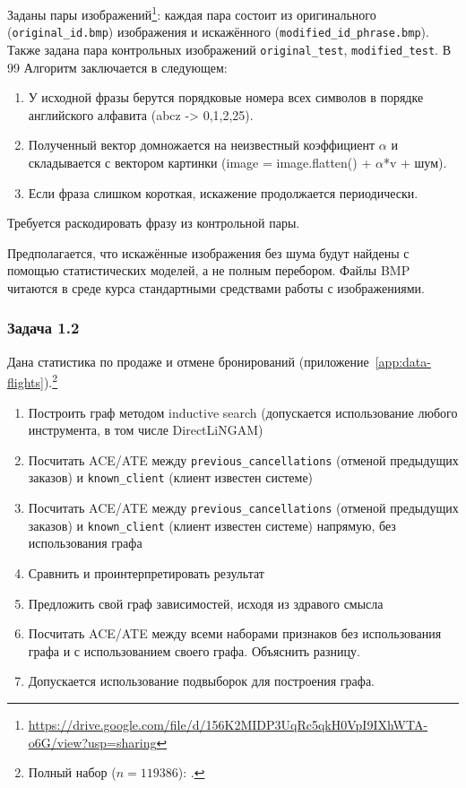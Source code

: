 Заданы пары изображений\footnote{\url{https://drive.google.com/file/d/156K2MIDP3UqRc5qkH0VpI9IXhWTA-o6G/view?usp=sharing}}: каждая пара состоит из оригинального (\texttt{original\_id.bmp}) изображения и искажённого (\texttt{modified\_id\_phrase.bmp}).
Также задана пара контрольных изображений \texttt{original\_test}, \texttt{modified\_test}.
В 99%
Алгоритм заключается в следующем:
\begin{enumerate}
    \item У исходной фразы берутся порядковые номера всех символов в порядке английского алфавита (abcz -> 0,1,2,25).
    \item Полученный вектор домножается на неизвестный коэффициент $\alpha$ и складывается с вектором картинки (image = image.flatten() + $\alpha$*v + шум).
    \item Если фраза слишком короткая, искажение продолжается периодически.
\end{enumerate}
Требуется раскодировать фразу из контрольной пары.
\begin{remark}
Предполагается, что искажённые изображения без шума будут найдены с помощью статистических моделей, а не полным перебором. Файлы BMP читаются в среде курса стандартными средствами работы с изображениями.
\end{remark}

\subsubsection{Задача 1.2}

Дана статистика по продаже и отмене бронирований (приложение~\ref{app:data-flights}).\footnote{Полный набор ($n=119386$): .}
\begin{enumerate}
    \item Построить граф методом inductive search (допускается использование любого инструмента, в том числе DirectLiNGAM)
    \item Посчитать ACE/ATE между \texttt{previous\_cancellations} (отменой предыдущих заказов) и \texttt{known\_client} (клиент известен системе)
    \item Посчитать ACE/ATE между \texttt{previous\_cancellations} (отменой предыдущих заказов) и \texttt{known\_client} (клиент известен системе) напрямую, без использования графа
    \item Сравнить и проинтерпретировать результат
    \item Предложить свой граф зависимостей, исходя из здравого смысла
    \item Посчитать ACE/ATE между всеми наборами признаков без использования графа и с использованием своего графа. Объяснить разницу.
    \item Допускается использование подвыборок для построения графа.
\end{enumerate}

